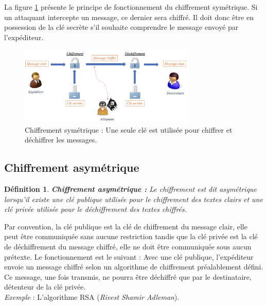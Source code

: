 \documentclass[oneside]{book}
\newtheorem{definition}{Définition}[section]
\begin{document}
\hspace{-0.5cm}La figure \ref{fig:symétrique} présente le principe de fonctionnement du chiffrement symétrique. Si un attaquant intercepte un message, ce dernier sera chiffré. Il doit donc être en possession de la clé secrète s'il souhaite comprendre le message envoyé par l'expéditeur.

\begin{figure}[htbp]
    \centering
    \includegraphics[width=0.75\textwidth]{image/symetrique}
    \caption{Chiffrement symétrique : Une seule clé est utilisée pour chiffrer et déchiffrer les messages.}
    \label{fig:symétrique}
\end{figure}


\newpage
\subsection{Chiffrement asymétrique}
\label{subsec:Chiffrement_asymétrique}

\theoremstyle{definition}
\begin{definition}{\textbf{Chiffrement asymétrique :}}
Le chiffrement est dit asymétrique lorsqu'il existe une clé publique utilisée pour le chiffrement des textes clairs et une clé privée utilisée pour le déchiffrement des textes chiffrés. 
\end{definition}

\hspace{-0.5cm}Par convention, la clé publique est la clé de chiffrement du message clair, elle peut être communiquée sans aucune restriction tandis que la clé privée est la clé de déchiffrement du message chiffré, elle ne doit être communiquée sous aucun prétexte. Le fonctionnement est le suivant : Avec une clé publique, l'expéditeur envoie un message chiffré selon un algorithme de chiffrement préalablement défini. Ce message, une fois transmis, ne pourra être déchiffré que par le destinataire, détenteur de la clé privée. \\
\textit{Exemple} : L'algorithme RSA (\textit{Rivest Shamir Adleman}).
\end{document}
